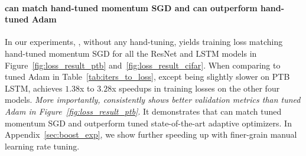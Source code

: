 \paragraph{\tuner can match hand-tuned momentum SGD and can outperform hand-tuned Adam}%
In our experiments, 
\tuner, without any hand-tuning, yields training loss matching hand-tuned momentum SGD for all the ResNet and LSTM models in Figure~\ref{fig:loss_result_ptb} and~\ref{fig:loss_result_cifar}.  
When comparing to tuned Adam in Table~\ref{tab:iters_to_loss}, except being slightly slower on PTB LSTM, \tuner achieves $1.38$x to $3.28$x speedups in training losses on the other four models. \emph{More importantly, \tuner consistently shows better validation metrics than tuned Adam in Figure~\ref{fig:loss_result_ptb}}. It demonstrates that \tuner can match tuned momentum SGD and outperform tuned state-of-the-art adaptive optimizers. %
In Appendix~\ref{sec:boost_exp}, we show \tuner further speeding up with finer-grain manual learning rate tuning.

